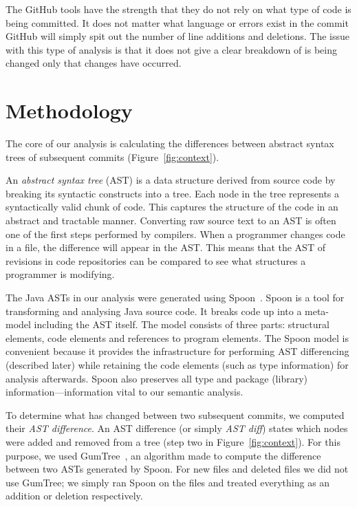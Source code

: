 \documentclass[conference]{IEEEtran}
\begin{document}
The GitHub tools have the strength that they do not rely on what type of code is being committed. It does not matter what language or errors exist in the commit GitHub will simply spit out the number of line additions and deletions. The issue with this type of analysis is that it does not give a clear breakdown of is being changed only that changes have occurred.

\section{Methodology}

The core of our analysis is calculating the differences between abstract syntax trees of subsequent commits (Figure~\ref{fig:context}).

An \emph{abstract syntax tree} (AST) is a data structure derived from source code by breaking its syntactic constructs into a tree. Each node in the tree represents a syntactically valid chunk of code. This captures the structure of the code in an abstract and tractable manner. Converting raw source text to an AST is often one of the first steps performed by compilers. When a programmer changes code in a file, the difference will appear in the AST. This means that the AST of revisions in code repositories can be compared to see what structures a programmer is modifying.

The Java ASTs in our analysis were generated using Spoon~\cite{pawlak:hal-01169705}. Spoon is a tool for transforming and analysing Java source code. It breaks code up into a meta-model including the AST itself. The model consists of three parts: structural elements, code elements and references to program elements. The Spoon model is convenient because it provides the infrastructure for performing AST differencing (described later) while retaining the code elements (such as type information) for analysis afterwards. Spoon also preserves all type and package (library) information—information vital to our semantic analysis.

To determine what has changed between two subsequent commits, we computed their \emph{AST difference}. An AST difference (or simply \emph{AST diff}) states which nodes were added and removed from a tree (step two in Figure~\ref{fig:context}). For this purpose, we used GumTree~\cite{falleri:hal-01054552}, an algorithm made to compute the difference between two ASTs generated by Spoon. For new files and deleted files we did not use GumTree; we simply ran Spoon on the files and treated everything as an addition or deletion respectively.
\end{document}
